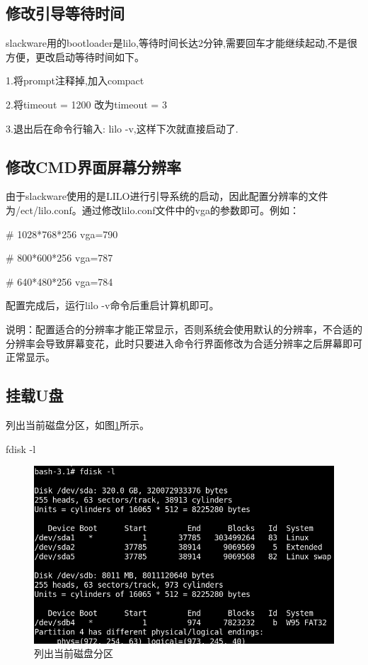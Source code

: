 \documentclass{book}
\begin{document}
\subsection{修改引导等待时间}

slackware用的bootloader是lilo,等待时间长达2分钟,需要回车才能继续起动,不是很方便，更改启动等待时间如下。

1.将prompt注释掉,加入compact

2.将timeout = 1200 改为timeout = 3

3.退出后在命令行输入: lilo -v,这样下次就直接启动了.

\subsection{修改CMD界面屏幕分辨率}

由于slackware使用的是LILO进行引导系统的启动，因此配置分辨率的文件为/ect/lilo.conf。通过修改lilo.conf文件中的vga的参数即可。例如：

\# 1028*768*256 
vga=790 

\# 800*600*256
vga=787

\# 640*480*256
vga=784

配置完成后，运行lilo -v命令后重启计算机即可。

说明：配置适合的分辨率才能正常显示，否则系统会使用默认的分辨率，不合适的分辨率会导致屏幕变花，此时只要进入命令行界面修改为合适分辨率之后屏幕即可正常显示。

\subsection{挂载U盘}

列出当前磁盘分区，如图\ref{fdisklist}所示。

fdisk -l

\begin{figure}[htbp]
	\centering
	\includegraphics[scale=0.5]{fdisklist.png}
	\caption{列出当前磁盘分区}
	\label{fdisklist}
\end{figure}
\end{document}
